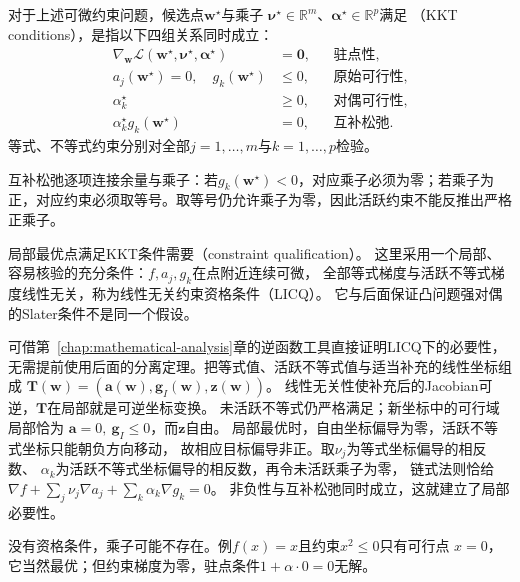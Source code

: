 \begin{definition}[KKT条件]
\label{def:opt-kkt-conditions}
对于上述可微约束问题，候选点$\bm w^\star$与乘子
$\bm\nu^\star\in\mathbb R^m$、$\bm\alpha^\star\in\mathbb R^p$满足
（KKT conditions），是指以下四组关系同时成立：
\begin{align}
  \nabla_{\bm{w}}\mathcal{L}(\bm{w}^{\star},\bm{\nu}^{\star},
  \bm{\alpha}^{\star})&=\bm{0},
  &&\text{驻点性},\label{eq:opt-kkt-stationarity}\\
  a_j(\bm{w}^{\star})=0,\quad g_k(\bm{w}^{\star})&\leq0,
  &&\text{原始可行性},\\
  \alpha_k^{\star}&\geq0,
  &&\text{对偶可行性},\\
  \alpha_k^{\star}g_k(\bm{w}^{\star})&=0,
  &&\text{互补松弛}.\label{eq:opt-kkt-complementarity}
\end{align}
等式、不等式约束分别对全部$j=1,\ldots,m$与$k=1,\ldots,p$检验。
\end{definition}
互补松弛逐项连接余量与乘子：若$g_k(\bm w^\star)<0$，对应乘子必须为零；若乘子为正，对应约束必须取等号。取等号仍允许乘子为零，因此活跃约束不能反推出严格正乘子。

局部最优点满足KKT条件需要（constraint qualification）。
这里采用一个局部、容易核验的充分条件：$f,a_j,g_k$在点附近连续可微，
全部等式梯度与活跃不等式梯度线性无关，称为线性无关约束资格条件（LICQ）。
它与后面保证凸问题强对偶的Slater条件不是同一个假设。

可借第~\ref{chap:mathematical-analysis}章的逆函数工具直接证明LICQ下的必要性，
无需提前使用后面的分离定理。把等式值、活跃不等式值与适当补充的线性坐标组成
$\bm T(\bm w)=(\bm a(\bm w),\bm g_I(\bm w),\bm z(\bm w))$。
线性无关性使补充后的Jacobian可逆，$\bm T$在局部就是可逆坐标变换。
未活跃不等式仍严格满足；新坐标中的可行域局部恰为
$\bm a=0,\ \bm g_I\leq0$，而$\bm z$自由。
局部最优时，自由坐标偏导为零，活跃不等式坐标只能朝负方向移动，
故相应目标偏导非正。取$\nu_j$为等式坐标偏导的相反数、
$\alpha_k$为活跃不等式坐标偏导的相反数，再令未活跃乘子为零，
链式法则恰给$\nabla f+\sum_j\nu_j\nabla a_j+\sum_k\alpha_k\nabla g_k=0$。
非负性与互补松弛同时成立，这就建立了局部必要性。

没有资格条件，乘子可能不存在。例$f(x)=x$且约束$x^2\leq0$只有可行点
$x=0$，它当然最优；但约束梯度为零，驻点条件$1+\alpha\cdot0=0$无解。

